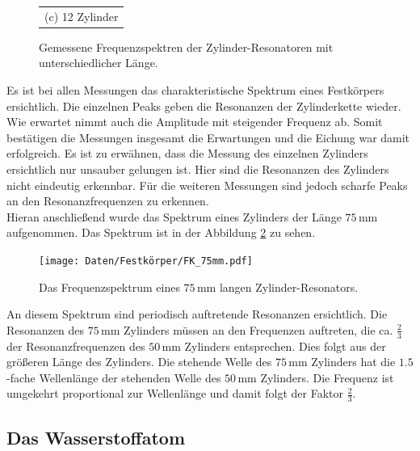 \begin{figure}[H]
\begin{tabular}{c}
    (c) 12 Zylinder \\[6pt]
    \end{tabular}
    \caption{Gemessene Frequenzspektren der Zylinder-Resonatoren mit unterschiedlicher Länge. } 
    \label{fig:zyl1-6-12}
\end{figure}

Es ist bei allen Messungen das charakteristische Spektrum eines Festkörpers ersichtlich. Die einzelnen Peaks geben die Resonanzen der Zylinderkette wieder. Wie erwartet nimmt auch die Amplitude mit steigender Frequenz ab. 
Somit bestätigen die Messungen insgesamt die Erwartungen und die Eichung war damit erfolgreich. 
Es ist zu erwähnen, dass die Messung des einzelnen Zylinders ersichtlich nur unsauber gelungen ist. Hier sind die Resonanzen des Zylinders nicht eindeutig erkennbar. Für die weiteren Messungen sind jedoch scharfe Peaks an den Resonanzfrequenzen zu erkennen. \\
Hieran anschließend wurde das Spektrum eines Zylinders der Länge $75\,\si{\milli\metre}$ aufgenommen. Das Spektrum ist in der Abbildung \ref{fig:fkp75mm} zu sehen.

\begin{figure}[H]
    \centering
    \texttt{[image: Daten/Festkörper/FK\_75mm.pdf]}
    \caption{Das Frequenzspektrum eines $75 \,\si{\milli\metre}$ langen Zylinder-Resonators. }
    \label{fig:fkp75mm}
\end{figure}
An diesem Spektrum sind periodisch auftretende Resonanzen ersichtlich. Die Resonanzen des $75 \,\si{\milli\metre}$ Zylinders müssen an den Frequenzen auftreten, die ca. $\frac{2}{3}$ der Resonanzfrequenzen des $50 \,\si{\milli\metre}$ Zylinders entsprechen. 
Dies folgt aus der größeren Länge des Zylinders. Die stehende Welle des $75 \,\si{\milli\metre}$ Zylinders hat die $1.5$-fache Wellenlänge der stehenden Welle des $50 \,\si{\milli\metre}$ Zylinders. Die Frequenz ist umgekehrt proportional zur Wellenlänge und damit folgt der Faktor $\frac{2}{3}$.

\subsection{Das Wasserstoffatom}

